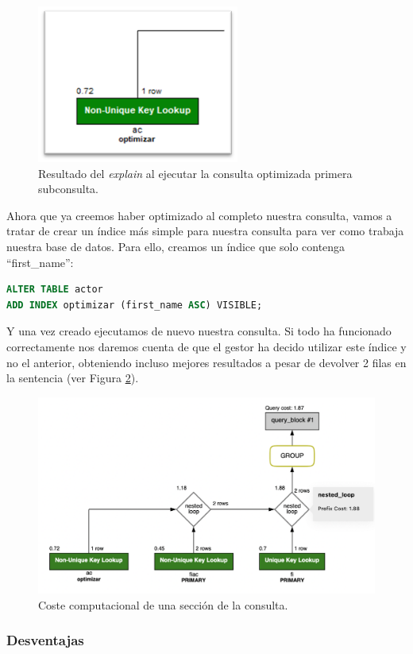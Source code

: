 \documentclass[a4paper]{article}
\begin{document}
\begin{figure}[ht]
    \centering
    \includegraphics[width=0.3\columnwidth]{figs/ejecucion1part1.png}
    \caption{Resultado del \emph{explain} al ejecutar la consulta optimizada primera subconsulta.}\label{fig:ejecucion1part1}
\end{figure}

Ahora que ya creemos haber optimizado al completo nuestra consulta, vamos a tratar de crear un índice más simple para nuestra consulta para ver como trabaja nuestra base de datos. Para ello, creamos un índice que solo contenga ``first\_name'':

\begin{lstlisting}[language=SQL]
ALTER TABLE actor
ADD INDEX optimizar (first_name ASC) VISIBLE;
\end{lstlisting}

Y una vez creado ejecutamos de nuevo nuestra consulta. Si todo ha funcionado correctamente nos daremos cuenta de que el gestor ha decido utilizar este índice y no el anterior, obteniendo incluso mejores resultados a pesar de devolver 2 filas en la sentencia (ver Figura \ref{fig:ejecucion1coste}).

\begin{figure}[ht]
    \centering
    \includegraphics[width=0.6\columnwidth]{figs/ejecucion1coste.png}
    \caption{Coste computacional de una sección de la consulta.}\label{fig:ejecucion1coste}
\end{figure}

\subsubsection*{Desventajas}
\end{document}
